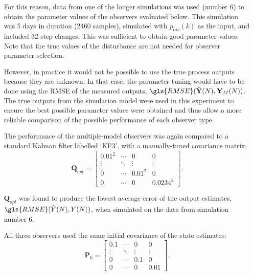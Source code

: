 For this reason, data from one of the longer simulations was used (number 6) to obtain the parameter values of the observers evaluated below. This simulation was 5 days in duration (2460 samples), simulated with $p_\text{ore}(k)$ as the input, and included 32 step changes. This was sufficient to obtain good parameter values. Note that the true values of the disturbance are not needed for observer parameter selection.

However, in practice it would not be possible to use the true process outputs because they are unknown. In that case, the parameter tuning would have to be done using the \gls{RMSE} of the measured outputs, $\gls{RMSE}(\hat{\mathbf{Y}}(N), \mathbf{Y}_M(N))$. The true outputs from the simulation model were used in this experiment to ensure the best possible parameter values were obtained and thus allow a more reliable comparison of the possible performance of each observer type.

The performance of the multiple-model observers was again compared to a standard Kalman filter labelled `KF3', with a manually-tuned covariance matrix,
\begin{equation} \label{eq:Q_opt}
	\mathbf{Q}_{opt}=\begin{bmatrix}
		0.01^2 & \cdots & 0 & 0 \\
		\vdots & \ddots & \vdots & \vdots \\
		0 & \cdots & 0.01^2 & 0 \\
		0 & \cdots & 0 & 0.0234^2
	\end{bmatrix}.
\end{equation}

$\mathbf{Q}_{opt}$ was found to produce the lowest average error of the output estimates, $\gls{RMSE}(\hat{Y}(N),Y(N))$, when simulated on the data from simulation number 6.

All three observers used the same initial covariance of the state estimates:
\begin{equation} \label{eq:P0}
	\mathbf{P}_0=\begin{bmatrix}
		0.1 & \cdots & 0 & 0 \\
		\vdots & \ddots & \vdots & \vdots \\
		0 & \cdots & 0.1 & 0 \\
		0 & \cdots & 0 & 0.01
	\end{bmatrix}.
\end{equation}

